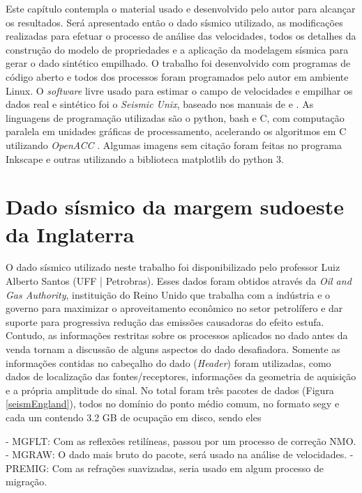 \documentclass[
	12pt,				%
	openright,			%
	oneside,			%
	a4paper,			%
	english,			%
	brazil				%
	]{abntex2}
\begin{document}
	Este capítulo contempla o material usado e desenvolvido pelo autor para alcançar os resultados. Será apresentado então o dado sísmico utilizado, as modificações realizadas para efetuar o processo de análise das velocidades, todos os detalhes da construção do modelo de propriedades e a aplicação da modelagem sísmica para gerar o dado sintético empilhado. O trabalho foi desenvolvido com programas de código aberto e todos dos processos foram programados pelo autor em ambiente Linux. O \textit{software} livre usado para estimar o campo de velocidades e empilhar os dados real e sintético foi o \textit{Seismic Unix}, baseado nos manuais de  e . As linguagens de programação utilizadas são o python, bash e C, com computação paralela em unidades gráficas de processamento, acelerando os algoritmos em C utilizando \textit{OpenACC} \cite{OpenACC}. Algumas imagens sem citação foram feitas no programa Inkscape e outras utilizando a biblioteca matplotlib do python 3.   

\section{Dado sísmico da margem sudoeste da Inglaterra}
    
    O dado sísmico utilizado neste trabalho foi disponibilizado pelo professor Luiz Alberto Santos (UFF | Petrobras). Esses dados foram obtidos através da \textit{Oil and Gas Authority}, instituição do Reino Unido que trabalha com a indústria e o governo para maximizar o aproveitamento econômico no setor petrolífero e dar suporte para progressiva redução das emissões causadoras do efeito estufa. Contudo, as informações restritas sobre os processos aplicados no dado antes da venda tornam a discussão de alguns aspectos do dado desafiadora. Somente as  informações contidas no cabeçalho do dado (\textit{Header}) foram utilizadas, como dados de localização das fontes/receptores, informações da geometria de aquisição e a própria amplitude do sinal. No total foram três pacotes de dados (Figura \ref{seismEngland}), todos no domínio do ponto médio comum, no formato segy e cada um contendo 3.2 GB de ocupação em disco, sendo eles 
    
    \noindent- MGFLT: Com as reflexões retilíneas, passou por um processo de correção NMO. \newline   
    \noindent- MGRAW: O dado mais bruto do pacote, será usado na análise de velocidades. \newline
    \noindent- PREMIG: Com as refrações suavizadas, seria usado em algum processo de migração.
        
\end{document}
